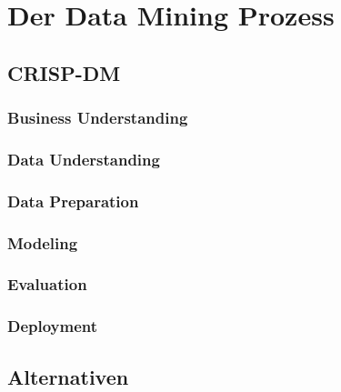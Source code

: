 %


%
%
\chapter{Der Data Mining Prozess}
\label{sec:process}

\section{CRISP-DM}
\label{sec:process:crispdm}

\subsection{Business Understanding}
\label{sec:process:crispdm:bu}

\subsection{Data Understanding}
\label{sec:process:crispdm:du}

\subsection{Data Preparation}
\label{sec:process:crispdm:dp}

\subsection{Modeling}
\label{sec:process:crispdm:mod}

\subsection{Evaluation}
\label{sec:process:crispdm:eval}

\subsection{Deployment}
\label{sec:process:crispdm:depl}

\section{Alternativen}
\label{sec:alt}
